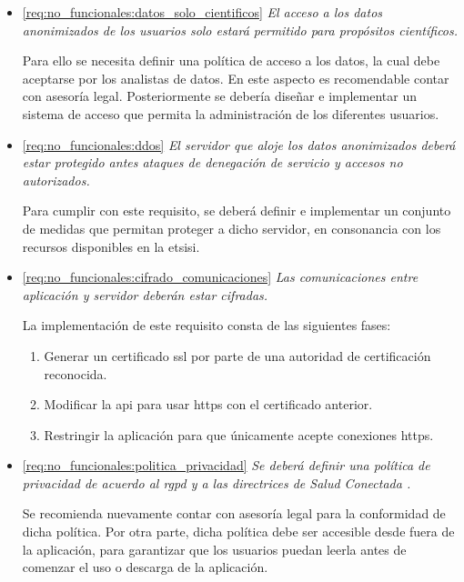     \begin{itemize}
        \item \ref{req:no_funcionales:datos_solo_cientificos} \textit{El acceso a los datos anonimizados de los usuarios solo estará permitido para propósitos científicos.}
        
        Para ello se necesita definir una política de acceso a los datos, la cual debe aceptarse por los analistas de datos. En este aspecto es recomendable contar con asesoría legal.
        Posteriormente se debería diseñar e implementar un sistema de acceso que permita la administración de los diferentes usuarios.
        
        \item \ref{req:no_funcionales:ddos} \textit{El servidor que aloje los datos anonimizados deberá estar protegido antes ataques de denegación de servicio y accesos no autorizados.}

        Para cumplir con este requisito, se deberá definir e implementar un conjunto de medidas que permitan proteger a dicho servidor, en consonancia con los recursos disponibles en la \gls{etsisi}.
        
        \item \ref{req:no_funcionales:cifrado_comunicaciones} \textit{Las comunicaciones entre aplicación y servidor deberán estar cifradas.}

        La implementación de este requisito consta de las siguientes fases:
        \begin{enumerate}
            \item Generar un certificado \gls{ssl} por parte de una autoridad de certificación reconocida.
            \item Modificar la \gls{api} para usar \gls{https} con el certificado anterior.
            \item Restringir la aplicación para que únicamente acepte conexiones \gls{https}.
        \end{enumerate}
        
        \item \ref{req:no_funcionales:politica_privacidad} \textit{Se deberá definir una política de privacidad de acuerdo al \gls{rgpd} \cite{publications_office_of_the_european_union_reglamento_nodate} y a las directrices de \textit{Salud Conectada} \cite{google_preguntas_nodate}.}

        Se recomienda nuevamente contar con asesoría legal para la conformidad de dicha política. Por otra parte, dicha política debe ser accesible desde fuera de la aplicación, para garantizar que los usuarios puedan leerla antes de comenzar el uso o descarga de la aplicación. 
    \end{itemize}

